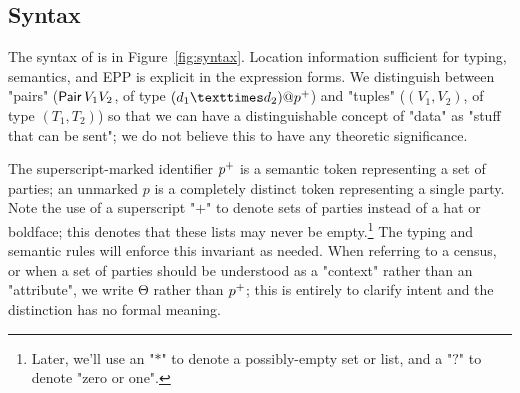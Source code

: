 \subsection{Syntax}\label{sec:syntax}
The syntax of \HLSCentral is in Figure~\ref{fig:syntax}.
Location information sufficient for typing, semantics, and EPP is explicit in
the expression forms.
We distinguish between "pairs"
($\operatorname{\mathsf{Pair}} V_1 V_2$, of type $(d_1 × d_2)@\nonempty{p}$)
and "tuples"
($(V_1, V_2)$, of type $(T_1, T_2)$)
so that we can have a distinguishable concept of "data" as "stuff that can be sent";
we do not believe this to have any theoretic significance.

The superscript-marked identifier ${p^{+}}$ is a semantic token representing a set of parties;
an unmarked $p$ is a completely distinct token representing a single party.
Note the use of a superscript "$+$" to denote sets of parties
instead of a hat or boldface;
this denotes that these lists may never be empty.\footnote{
Later, we'll use an "$\ast$" to denote a possibly-empty set or list,
and a "$?$" to denote "zero or one".
}
The typing and semantic rules will enforce this invariant as needed.
When referring to a census, or when a set of parties should be understood as a "context"
rather than an "attribute",
we write Θ rather than ${p^{+}}$;
this is entirely to clarify intent and the distinction has no formal meaning.

